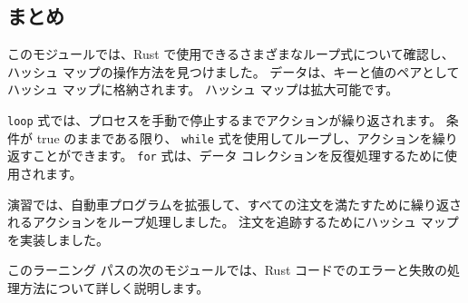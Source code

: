 \subsection{まとめ}

このモジュールでは、Rust で使用できるさまざまなループ式について確認し、ハッシュ マップの操作方法を見つけました。 データは、キーと値のペアとしてハッシュ マップに格納されます。 ハッシュ マップは拡大可能です。

\texttt{loop} 式では、プロセスを手動で停止するまでアクションが繰り返されます。 条件が true のままである限り、 \texttt{while} 式を使用してループし、アクションを繰り返すことができます。 \texttt{for} 式は、データ コレクションを反復処理するために使用されます。

演習では、自動車プログラムを拡張して、すべての注文を満たすために繰り返されるアクションをループ処理しました。 注文を追跡するためにハッシュ マップを実装しました。

このラーニング パスの次のモジュールでは、Rust コードでのエラーと失敗の処理方法について詳しく説明します。

